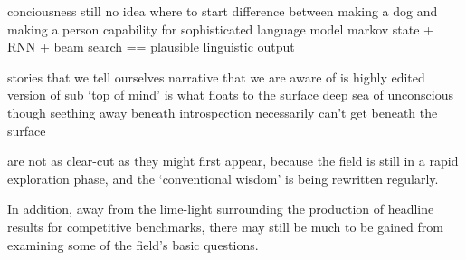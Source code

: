 \documentclass[citeauthoryear]{llncs}
\begin{document}
conciousness 
  still no idea where to start
  difference between making a dog and making a person
    capability for sophisticated language model
      markov state + RNN + beam search == plausible linguistic output
  
  stories that we tell ourselves
    narrative that we are aware of is highly edited version of sub
      `top of mind' is what floats to the surface
      deep sea of unconscious though seething away beneath
  introspection necessarily can't get beneath the surface

 are not as clear-cut as they might first appear,
because the field is still in a rapid exploration phase, and the `conventional wisdom' is
being rewritten regularly.  

In addition, away from the lime-light surrounding 
the production of headline results for competitive benchmarks, 
there may still be much to be gained from examining some of 
the field's basic questions.
\end{document}
